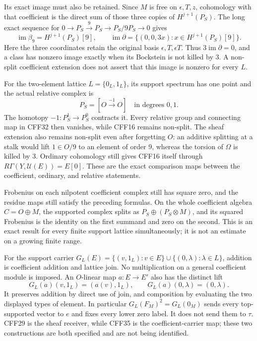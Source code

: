\documentclass[11pt]{article}
\newcommand{\im}{\operatorname{im}}
\begin{document}
Its exact image must also be retained. Since \(M\) is free
on \(\epsilon,T,z\), cohomology with that coefficient is
the direct sum of those three copies of \(H^{j+1}(P_S)\).
The long exact sequence for
\(0\to P_S\xrightarrow{9}P_S\to P_S/9P_S\to0\) gives
\[
 \im\beta_9=H^{j+1}(P_S)[9],\qquad
 \im\partial=\{(0,0,3x):x\in H^{j+1}(P_S)[9]\}.
 \tag{CFF34a}
\]
Here the three coordinates retain the original basis
\(\epsilon,T,\epsilon T\). Thus \(3\im\partial=0\), and
a class has nonzero image exactly when its Bockstein is
not killed by 3. A non-split coefficient extension does
not assert that this image is nonzero for every \(L\).

For the two-element lattice \(L=\{0_L,1_L\}\), its support
spectrum has one point and the actual relative complex is
\[
             P_S=[O\xrightarrow{-1}O]
             \quad\text{in degrees }0,1 .
 \tag{CFF34b}
\]
The homotopy \(-1:P_S^1\to P_S^0\) contracts it.
Every relative group and connecting map in CFF32 then
vanishes, while CFF16 remains non-split. The sheaf
extension also remains non-split even after forgetting \(O\):
an additive splitting at a stalk would lift \(1\in O/9\)
to an element of order 9, whereas the torsion of
\(\Omega\) is killed by 3. Ordinary cohomology still gives CFF16 itself
through \(R\Gamma(Y,\mathcal U(E))=E[0]\). These are the
exact comparison maps between the coefficient, ordinary,
and relative statements.

Frobenius on each nilpotent coefficient complex still
has square zero, and the residue maps still satisfy
the preceding formulas. On the whole coefficient
algebra \(C=O\oplus M\), the supported complex splits
as \(P_S\oplus(P_S\otimes M)\), and its squared
Frobenius is the identity on the first summand and
zero on the second. This is an exact result for every
finite support lattice simultaneously; it is not an
estimate on a growing finite range.

For the support carrier
\(G_L(E)=\{(v,1_L):v\in E\}\cup
\{(0,\lambda):\lambda\in L\}\), addition is coefficient
addition and lattice join. No multiplication on a
general coefficient module is imposed. An \(O\)-linear map
\(a:E\to E'\) also has the distinct lift
\[
 G_L(a)(v,1_L)=(a(v),1_L),\qquad
 G_L(a)(0,\lambda)=(0,\lambda).
 \tag{CFF35}
\]
It preserves addition by direct use of join, and
composition by evaluating the two displayed types
of element. In particular \(G_L(F_M)^2=G_L(0_M)\)
sends every top-supported vector to \(e\) and fixes
every lower zero label. It does not send them to
\(\tau\). CFF29 is the sheaf receiver, while CFF35 is
the coefficient-carrier map; these two constructions
are both specified and are not being identified.
\end{document}
